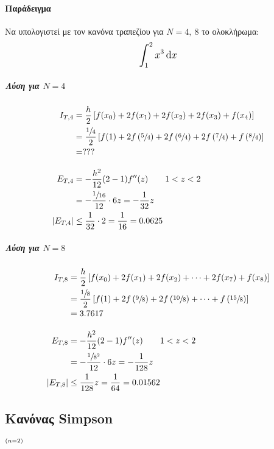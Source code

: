 \documentclass[11pt,a4paper,notitlepage,fleqn]{article}
\begin{document}
    \paragraph{Παράδειγμα}
    Να υπολογιστεί με τον κανόνα τραπεζίου για \( N=4,\ 8 \) το
    ολοκλήρωμα:
    \[
    \mathlarger{\int_{1}^{2} x^3\dif x}
    \]
    \subparagraph{Λύση για \( N=4 \)}
    \begin{align*}
    	I_{T,4} &= \frac{h}{2} \left[
    	f(x_0)+2f(x_1)+2f(x_2)+2f(x_3)+f(x_4)
    	\right] \\ &= \frac{\sfrac{1}{4} }{2}\left[
    	f(1)+2f\left(\sfrac{5}{4}\right)+2f\left(\sfrac{6}{4}\right)
    	+2f\left(\sfrac{7}{4}\right)+f\left(\sfrac{8}{4}\right)
    	\right]
    	\\ &= ??? \\[3ex]
    	E_{T,4} &= -\frac{h^2}{12}(2-1)f''(z) \qquad 1<z<2 \\
    	&= - \frac{\sfrac{1}{16} }{12} \cdot 6z = -\frac{1}{32}z
    	\\ \left|E_{T,4}\right| &\leq \frac{1}{32}\cdot 2
    	=\frac{1}{16} = 0.0625
    \end{align*}
    
    \subparagraph{Λύση για \( N=8 \)}
    \begin{align*}
        I_{T,8} &= \frac{h}{2} \left[
        f(x_0)+2f(x_1)+2f(x_2)+\dots+2f(x_7)+f(x_8)
        \right] \\ &= \frac{\sfrac{1}{8} }{2}\left[
        f(1)+2f\left(\sfrac{9}{8}\right)+2f\left(\sfrac{10}{8}\right)
        +\dots+f\left(\sfrac{15}{8}\right)
        \right]
        \\ &= 3.7617 \\[3ex]
    	E_{T,8} &= -\frac{h^2}{12}(2-1)f''(z) \qquad 1<z<2 \\
    	&= -\frac{\sfrac{1}{8^2} }{12}\cdot 6z=-\frac{1}{128}z \\
    	|E_{T,8}| &\leq \frac{1}{128}z=\frac{1}{64}=0.01562
    \end{align*}
    
    \subsection{Κανόνας Simpson}
    \( \mathsmaller{(n = 2)} \)
    
\end{document}
